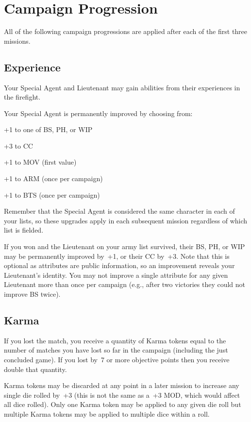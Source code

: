 \chapter{Campaign Progression}

All of the following campaign progressions are applied after each of
the first three missions.

\section{Experience}

Your Special Agent and Lieutenant may gain abilities from their
experiences in the firefight.

  Your Special Agent is permanently
improved by choosing from:

\begin{squishitemize}
\item +1 to one of BS, PH, or WIP
\item +3 to CC
\item +1 to MOV (first value)
\item +1 to ARM (once per campaign)
\item +1 to BTS (once per campaign)
\end{squishitemize}

Remember that the Special Agent is considered the same character in
each of your lists, so these upgrades apply in each subsequent mission
regardless of which list is fielded.

  If you won and the Lieutenant on your army
list survived, their BS, PH, or WIP may be permanently improved by~+1,
or their CC by~+3.  Note that this is optional as attributes are
public information, so an improvement reveals your Lieutenant's
identity.  You may not improve a single attribute for any given
Lieutenant more than once per campaign (e.g., after two victories they
could not improve BS twice).

\section{Karma}

If you lost the match, you receive a quantity of Karma tokens equal to
the number of matches you have lost so far in the campaign (including
the just concluded game).  If you lost by~7 or more objective points
then you receive double that quantity.

Karma tokens may be discarded at any point in a later mission to
increase any single die rolled by~+3 (this is not the same as a~+3
MOD, which would affect all dice rolled).  Only one Karma token may be
applied to any given die roll but multiple Karma tokens may be applied
to multiple dice within a roll.

